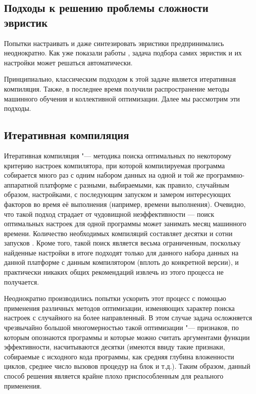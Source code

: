 \subsection{Подходы к решению проблемы сложности эвристик}
Попытки настраивать и даже синтезировать \cite{Stephenson:2006:ACC:1269626,Stephenson:2003:MOI:780822.781141} эвристики предпринимались неоднократно. Как уже показали работы \cite{Agakov:2006:UML:1121992.1122412,Bodin98iterativecompilation,FCA2007,Cooper:2005:AAC:1065910.1065921}, задача подбора самих эвристик и их настройки может решаться автоматически.

Принципиально, классическим подходом к этой задаче является итеративная компиляция. Также, в последнее время получили распространение методы машинного обучения и коллективной оптимизации. Далее мы рассмотрим эти подходы.


\subsection{Итеративная компиляция}
Итеративная компиляция "--- методика поиска оптимальных по некоторому критерию настроек компилятора, при которой компилируемая программа собирается много раз с одним набором данных на одной и той же программно-аппаратной платформе с разными, выбираемыми, как правило, случайным образом, настройками, с последующим запуском и замером интересующих факторов во время её выполнения (например, времени выполнения). Очевидно, что такой подход страдает от чудовищной неэффективности --- поиск оптимальных настроек для одной программы может занимать месяц машинного времени. Количество необходимых компиляций составляет десятки и сотни запусков \cite{Kisuki:1999:FSI:646347.690219}. Кроме того, такой поиск является весьма ограниченным, поскольку найденные настройки в итоге подходят только для данного набора данных на данной платформе с данным компилятором (вплоть до конкретной версии), и практически никаких общих рекомендаций извлечь из этого процесса не получается.

Неоднократно производились попытки ускорить этот процесс с помощью применения различных методов оптимизации, изменяющих характер поиска настроек с случайного на более направленный. В этом случае задача осложняется чрезвычайно большой многомерностью такой оптимизации "--- признаков, по которым опознаются программы и которые можно считать аргументами функции эффективности, насчитываются десятки (имеются ввиду такие признаки, собираемые с исходного кода программы, как средняя глубина вложенности циклов, среднее число вызовов процедур на блок и т.д.). Таким образом, данный способ решения является крайне плохо приспособленным для реального применения.


